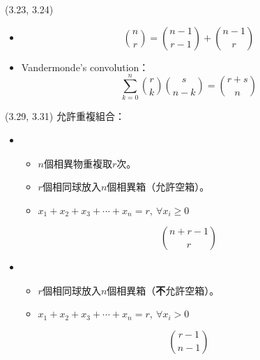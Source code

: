 \item \begin{theorem}{(3.23, 3.24)} \quad\quad
    \begin{itemize}
        \item \begin{equation}
            \binom{n}{r}  = \binom{n - 1}{r - 1} + \binom{n - 1}{r}   
        \end{equation}
        \item Vandermonde's convolution：
        \begin{equation}
            \sum_{k = 0}^{n}\binom{r}{k}\binom{s}{n - k} = \binom{r + s}{n}
        \end{equation}
    \end{itemize}
\end{theorem}

\item \begin{theorem}{(3.29, 3.31)} 允許重複組合：
    \begin{itemize}
        \item \begin{itemize}
            \item $n$個相異物重複取$r$次。
            \item $r$個相同球放入$n$個相異箱（允許空箱）。
            \item $x_1 + x_2 + x_3 + \cdots + x_n = r, \ \forall x_i \ge 0$
        \end{itemize}
        \begin{equation}
            \binom{n + r - 1}{r}
        \end{equation}
        \item \begin{itemize}
            \item $r$個相同球放入$n$個相異箱（\textbf{不}允許空箱）。
            \item $x_1 + x_2 + x_3 + \cdots + x_n = r, \ \forall x_i > 0$
        \end{itemize}
        \begin{equation}
            \binom{r - 1}{n - 1}
        \end{equation}
    \end{itemize}
\end{theorem}


